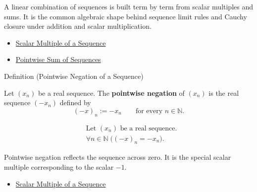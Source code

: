 \begin{remark*}[Interpretation]
A linear combination of sequences is built term by term from scalar
multiples and sums. It is the common algebraic shape behind sequence limit
rules and Cauchy closure under addition and scalar multiplication.
\end{remark*}

\begin{dependencies}
\begin{itemize}
  \item \hyperref[def:scalar-multiple-sequence]{Scalar Multiple of a Sequence}
  \item \hyperref[def:pointwise-sum-sequence]{Pointwise Sum of Sequences}
\end{itemize}
\end{dependencies}


\begin{definitionbox}{Definition (Pointwise Negation of a Sequence)}
\begin{definition}
\label{def:pointwise-negation-sequence}
Let $(x_n)$ be a real sequence. The \textbf{pointwise negation} of
$(x_n)$ is the real sequence $(-x_n)$ defined by
\[
(-x)_n := -x_n
\qquad
\text{for every } n\in\mathbb{N}.
\]
\end{definition}
\end{definitionbox}

\begin{remark*}
\[
\begin{aligned}
&\text{Let } (x_n) \text{ be a real sequence.}\\
&\forall n\in\mathbb{N}\;\bigl((-x)_n=-x_n\bigr).
\end{aligned}
\]
\end{remark*}

\begin{remark*}[Interpretation]
Pointwise negation reflects the sequence across zero. It is the special scalar
multiple corresponding to the scalar $-1$.
\end{remark*}

\begin{dependencies}
\begin{itemize}
  \item \hyperref[def:scalar-multiple-sequence]{Scalar Multiple of a Sequence}
\end{itemize}
\end{dependencies}

